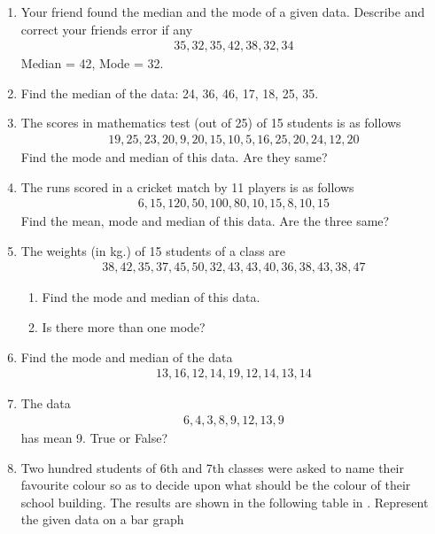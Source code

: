 \begin{enumerate}[label=\thesubsection.\arabic*, ref=\thesubsection.\theenumi,resume*]
\item Your friend found the median and the mode of a given data. Describe and correct your friends error if any
\begin{gather*}
	35, 32, 35, 42, 38, 32, 34 
\end{gather*}
Median = 42, Mode = 32.
\item Find the median of the data: 24, 36, 46, 17, 18, 25, 35.
\item The scores in mathematics test (out of 25) of 15 students is as follows
	\begin{gather*}
	19, 25, 23, 20, 9, 20, 15, 10, 5, 16, 25, 20, 24, 12, 20 
\end{gather*}
Find the mode and median of this data. Are they same?
\item The runs scored in a cricket match by 11 players is as follows 
	\begin{gather*}
	6, 15, 120, 50, 100, 80, 10, 15, 8, 10, 15
\end{gather*}
Find the mean, mode and median of this data. Are the three same?
\item The weights (in kg.) of 15 students of a class are
	\begin{gather*}
	38, 42, 35, 37, 45, 50, 32, 43, 43, 40, 36, 38, 43, 38, 47
\end{gather*}
\begin{enumerate}
	\item  Find the mode and median of this data. 
	\item Is there more than one mode?
\end{enumerate}
\item Find the mode and median of the data
	\begin{gather*}
	13, 16, 12, 14, 19, 12, 14, 13, 14
\end{gather*}
\item
	The data 
	\begin{gather*}
	6, 4, 3, 8, 9, 12, 13, 9 
\end{gather*}
has mean 9.  True or False?
\item Two hundred students of 6th and 7th classes were asked to name their favourite colour so as to decide upon what should be the colour of their school building. The results are shown in the following table
  in   .
	 Represent the given data on a bar graph
	\begin{table}[H]
  \centering

\end{table}
\end{enumerate}
